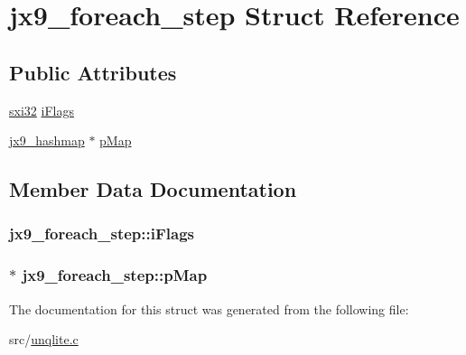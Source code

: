 \hypertarget{structjx9__foreach__step}{\section{jx9\-\_\-foreach\-\_\-step Struct Reference}
\label{d8/dc0/structjx9__foreach__step}
}
\subsection*{Public Attributes}
\begin{DoxyCompactItemize}
\item 
\hyperlink{unqlite_8c_a5a58035d4ae379178e2ca46cc3272fc5}{sxi32} \hyperlink{structjx9__foreach__step_a3abeb429bbefc64a6c3f77c2c98b6da3}{i\-Flags}
\item 
\hyperlink{structjx9__hashmap}{jx9\-\_\-hashmap} $\ast$ \hyperlink{structjx9__foreach__step_ae087f0c5ff2a77fb2d8e36bda5369fa0}{p\-Map}
\end{DoxyCompactItemize}


\subsection{Member Data Documentation}
\hypertarget{structjx9__foreach__step_a3abeb429bbefc64a6c3f77c2c98b6da3}{
\subsubsection[{i\-Flags}]{ jx9\-\_\-foreach\-\_\-step\-::i\-Flags}}\label{d8/dc0/structjx9__foreach__step_a3abeb429bbefc64a6c3f77c2c98b6da3}
\hypertarget{structjx9__foreach__step_ae087f0c5ff2a77fb2d8e36bda5369fa0}{
\subsubsection[{p\-Map}]{$\ast$ jx9\-\_\-foreach\-\_\-step\-::p\-Map}}\label{d8/dc0/structjx9__foreach__step_ae087f0c5ff2a77fb2d8e36bda5369fa0}


The documentation for this struct was generated from the following file\-:\begin{DoxyCompactItemize}
\item 
src/\hyperlink{unqlite_8c}{unqlite.\-c}\end{DoxyCompactItemize}
